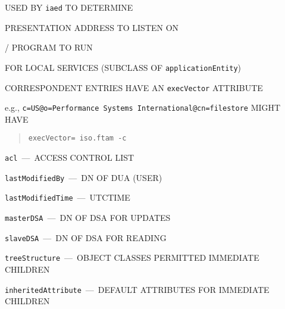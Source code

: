 \begin{bwslide}

\begin{nrtc}
\item	USED BY \verb"iaed" TO DETERMINE
    \begin{nrtc}
    \item	PRESENTATION ADDRESS TO LISTEN ON

    \item	\unix/ PROGRAM TO RUN
    \end{nrtc}
    FOR LOCAL SERVICES (SUBCLASS OF \verb"applicationEntity")

\item	CORRESPONDENT ENTRIES HAVE AN \verb"execVector" ATTRIBUTE

\item	e.g., \verb"c=US@o=Performance Systems International@cn=filestore"
	MIGHT HAVE
\begin{quote}\small\begin{verbatim}
execVector= iso.ftam -c
\end{verbatim}\end{quote}
\end{nrtc}
\end{bwslide}


\begin{bwslide}

\begin{nrtc}
\item	\verb"acl"~---~ACCESS CONTROL LIST

\item	\verb"lastModifiedBy"~---~DN OF DUA (USER)

\item	\verb"lastModifiedTime"~---~UTCTIME
\end{nrtc}
\end{bwslide}


\begin{bwslide}

\begin{nrtc}
\item	\verb"masterDSA"~---~DN OF DSA FOR UPDATES

\item	\verb"slaveDSA"~---~DN OF DSA FOR READING

\item	\verb"treeStructure"~---~OBJECT CLASSES PERMITTED IMMEDIATE CHILDREN

\item	\verb"inheritedAttribute"~---~DEFAULT ATTRIBUTES FOR IMMEDIATE CHILDREN
\end{nrtc}
\end{bwslide}



